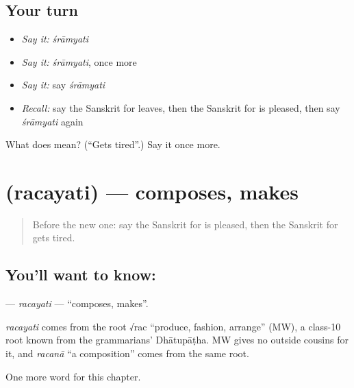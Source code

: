 \subsection*{Your turn}
\begin{itemize}
\raggedright
  \item \emph{Say it:} \emph{śrāmyati}
  \item \emph{Say it:} \emph{śrāmyati}, once more
  \item \emph{Say it:} say \emph{śrāmyati}
  \item \emph{Recall:} say the Sanskrit for leaves, then the Sanskrit for is pleased, then say \emph{śrāmyati} again
\end{itemize}

\begin{tcolorbox}[breakable,colback=teal!4,colframe=teal!35!black,title={Before you move on}]
What does  mean? (\textquotedblleft{}Gets tired\textquotedblright{}.) Say it once more.
\end{tcolorbox}
\section[\texorpdfstring{\sk{रचयति} (racayati)}{रचयति (racayati)}]{ (racayati) — composes, makes}

\label{lesson:SA-C142-racayati}



\begin{quote}
Before the new one: say the Sanskrit for is pleased, then the Sanskrit for gets tired.
\end{quote}

\subsection*{You'll want to know: }
\textbf{} — \emph{racayati} — \textquotedblleft{}composes, makes\textquotedblright{}.

\begin{cousinweb}
\emph{racayati} comes from the root √rac \textquotedblleft{}produce, fashion, arrange\textquotedblright{} (MW), a class-10 root known from the grammarians' Dhātupāṭha. MW gives no outside cousins for it, and \emph{racanā} \textquotedblleft{}a composition\textquotedblright{} comes from the same root.
\end{cousinweb}

\begin{grammarlens}[title={What you've built}]
One more word for this chapter.
\end{grammarlens}

